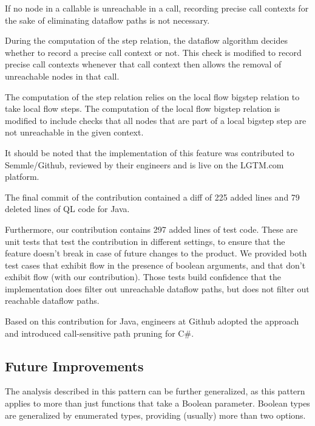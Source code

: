 If no node in a callable is unreachable in a call, 
recording precise call contexts for the sake of eliminating dataflow paths 
is not necessary.

During the computation of the step relation, the dataflow algorithm 
decides whether to record a precise call context or not.
This check is modified to record precise call contexts whenever that call context 
then allows the removal of unreachable nodes in that call.

The computation of the step relation relies on the local flow bigstep relation
to take local flow steps.
The computation of the local flow bigstep relation is modified to include checks 
that all nodes that are part of a local bigstep step are not unreachable in the 
given context.


It should be noted that the implementation of this feature was contributed to Semmle/Github,
reviewed by their engineers and is live on the LGTM.com platform.

The final commit of the contribution contained a diff of 225 added lines and 
79 deleted lines of QL code for Java.

Furthermore, our contribution contains 297 added lines of test code.
These are unit tests that test the contribution in different settings, to ensure 
that the feature doesn't break in case of future changes to the product.
We provided both test cases that exhibit flow in the presence of boolean 
arguments, and that don't exhibit flow (with our contribution).
Those tests build confidence that the implementation does filter out unreachable 
dataflow paths, but does not filter out reachable dataflow paths.

Based on this contribution for Java, engineers at Github adopted 
the approach and introduced call-sensitive path pruning for C\#.

\subsection{Future Improvements}
The analysis described in this pattern can be further generalized, as
this pattern applies to more than just functions that take a Boolean parameter.
Boolean types are generalized by enumerated types, providing (usually) more than two options.

